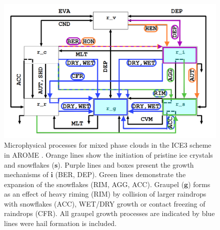 \begin{figure}[!t]
	\centering
	\includegraphics[width=\textwidth]{./fig_MEPS/ICE3_scheme_copy}
	\caption{Microphysical processes for mixed phase clouds in the ICE3 scheme in AROME \citep[adapted from ][]{meteo_france_meso-nh_2009}. %
    Orange lines show the initiation of pristine ice crystals and snowflakes ($\mathbf{s}$). Purple  lines and boxes present the growth mechanisms of $\mathbf{i}$ (BER, DEP). Green lines demonstrate the expansion of the snowflakes (RIM, AGG, ACC). Graupel ($\mathbf{g}$) forms as an effect of heavy riming (RIM) by collision of larger raindrops with snowflakes (ACC), WET/DRY growth or contact freezing of raindrops (CFR). All graupel growth processes are indicated by blue lines were hail formation is included. 
    }\label{fig:ICE3_scheme}
\end{figure}